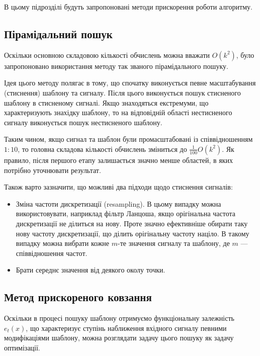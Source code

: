     В цьому підрозділі будуть запропоновані методи прискорення роботи алгоритму.

    \subsection{Пірамідальний пошук}
        Оскільки основною складовою кількості обчислень можна вважати $O(k^2)$, було запропоновано використання методу
        так званого пірамідального пошуку.

        Ідея цього методу полягає в тому, що спочатку виконується певне масштабування (стиснення) шаблону та сигналу.
        Після цього виконується пошук стисненого шаблону в стисненому сигналі.
        Якщо знаходяться екстремуми, що характеризують знахідку шаблону, то на відповідній області нестисненого
        сигналу виконується пошук нестисненого шаблону.

        Таким чином, якщо сигнал та шаблон були промасштабовані із співвідношенням $1:10$, то головна складова
        кількості обчислень зміниться до $\frac{1}{100} O(k^2)$.
        Як правило, після першого етапу залишається значно менше областей, в яких потрібно уточнювати результат.

        Також варто зазначити, що можливі два підходи щодо стиснення сигналів:
        \begin{itemize}
            \item Зміна частоти дискретизації (resampling).
                В цьому випадку можна використовувати, наприклад фільтр Ланцоша, якщо орігінальна частота
                дискретизації не ділиться на нову.
                Проте значно ефективніше обирати таку нову частоту дискретизації, що ділить орігінальну частоту
                націло.
                В такому випадку можна вибрати кожне $m$-те значення сигналу та шаблону, де $m$ --- співвідношення
                частот.
            \item Брати середнє значення від деякого околу точки.
        \end{itemize}
    \subsection{Метод прискореного ковзання}
        Оскільки в процесі пошуку шаблону отримуємо функціональну залежність $e_t(x)$, що характеризує ступінь
        наближення вхідного сигналу певними модифікаціями шаблону, можна розглядати задачу цього пошуку як задачу
        оптимізації.

